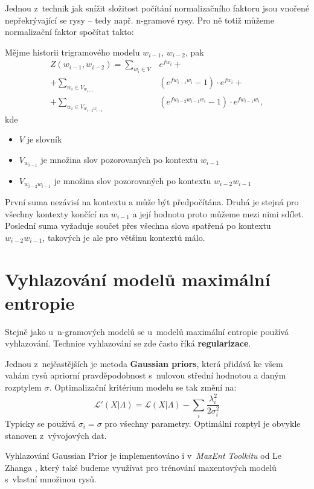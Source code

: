 \documentclass[12pt,a4paper]{report}
\begin{document}
Jednou z~technik jak snížit složitost počítání normalizačního faktoru jsou vnořené nepřekrývající se rysy -- tedy např. n-gramové rysy. Pro ně totiž můžeme normalizační faktor spočítat takto:

Mějme historii trigramového modelu $w_{i-1}$, $w_{i-2}$, pak
\begin{equation}
\begin{split}
Z(w_{i-1}, w_{i-2}) = \sum_{w_i \in V} & e^{fw_i} + \\ 
+ \sum_{w_i \in V_{w_{i-1}}} & (e^{fw_{i-1}w_i} - 1) \cdot e^{fw_i} + \\
+ \sum_{w_i \in V_{w_{i-2} w_{i-1}}} & (e^{fw_{i-2}w_{i-1}w_i} -1) \cdot e^{fw_{i-1}w_i},
\end{split}
\end{equation}
kde \begin{itemize}
\item{$V$ je slovník}
\item{$V_{w_{i-1}}$ je množina slov pozorovaných po kontextu $w_{i-1}$}
\item{$V_{w_{i-2}w_{i-1}}$ je množina slov pozorovaných po kontextu $w_{i-2}w_{i-1}$}
\end{itemize}
První suma nezávisí na kontextu a může být předpočítána. Druhá je stejná pro všechny kontexty končící na $w_{i-1}$ a její hodnotu proto můžeme mezi nimi sdílet. Poslední suma vyžaduje součet přes všechna slova spatřená po kontextu $w_{i-2}w_{i-1}$, takových je ale pro většinu kontextů málo.

\section{Vyhlazování modelů maximální entropie}

Stejně jako u~n-gramových modelů se u~modelů maximální entropie používá vyhlazování. Technice vyhlazování se zde často říká \textbf{regularizace}. 

Jednou z~nejčastějších je metoda \textbf{Gaussian priors}, která přidává ke všem vahám rysů apriorní pravděpodobnost s~nulovou střední hodnotou a daným rozptylem $\sigma$. Optimalizační kritérium modelu se tak změní na:
\begin{equation}
\mathcal{L}'(X|\Lambda) = \mathcal{L}(X|\Lambda) - \sum_i \frac{\lambda_i^2}{2\sigma_i^2}
\end{equation}
Typicky se používá $\sigma_i = \sigma$ pro všechny parametry. Optimální rozptyl je obvykle stanoven z~vývojových dat.

Vyhlazování Gaussian Prior je implementováno i v~\textit{MaxEnt Toolkitu} od Le Zhanga \cite{lzhang}, který také budeme využívat pro trénování maxentových modelů s~vlastní množinou rysů.
\end{document}
